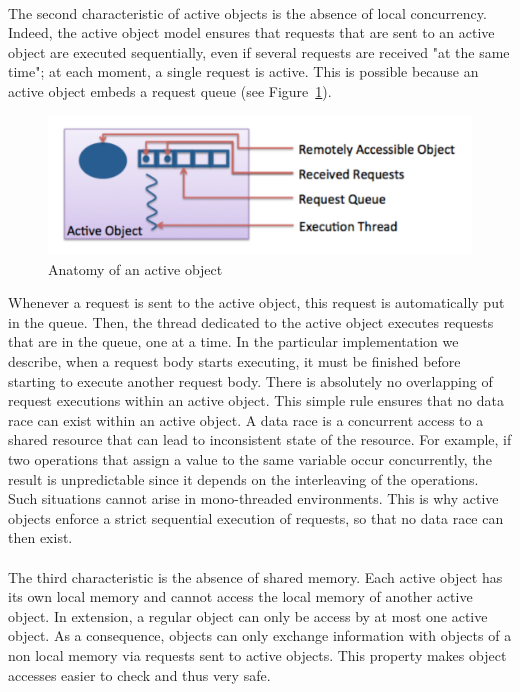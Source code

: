 \documentclass[11pt]{report}
\begin{document}
\paragraph{}
The second characteristic of active objects is the absence of local concurrency. Indeed, the active object model ensures that requests that are sent to an active object are executed sequentially, even if several requests are received "at the same time"; at each moment, a single request is active.
This is possible because an active object embeds a request queue (see Figure~\ref{fig:active_object}).
\begin{figure}[ht]
      \begin{minipage}[c]{\textwidth}
      \centering
      \includegraphics[scale=0.5]{pictures/active_object.pdf}
      \end{minipage}
      \caption{Anatomy of an active object}
      \label{fig:active_object}
\end{figure}
Whenever a request is sent to the active object, this request is automatically put in the queue. Then, the thread dedicated to the active object executes requests that are in the queue, one at a time. In the particular implementation we describe, when a request body starts executing, it must be finished before starting to execute another request body. There is absolutely no overlapping of request executions within an active object.
This simple rule ensures that no data race can exist within an active object. A data race is a concurrent access to a shared resource that can lead to inconsistent state of the resource. For example, if two operations that assign a value to the same variable occur concurrently, the result is unpredictable since it depends on the interleaving of the operations.
Such situations cannot arise in mono-threaded environments. This is why active objects enforce a strict sequential execution of requests, so that no data race can then exist.

\paragraph{}
The third characteristic is the absence of shared memory. Each active object has its own local memory and cannot access the local memory of another active object. In extension, a regular object can only be access by at most one active object. As a consequence, objects can only exchange information with objects of a non local memory via requests sent to active objects. This property makes object accesses easier to check and thus very safe.
\end{document}
